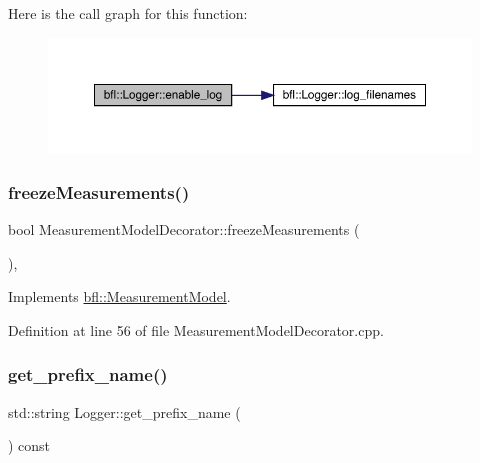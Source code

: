 Here is the call graph for this function\+:
\nopagebreak
\begin{figure}[H]
\begin{center}
\leavevmode
\includegraphics[width=350pt]{classbfl_1_1Logger_ae94b97b6e8d7902e8ce048384813122e_cgraph}
\end{center}
\end{figure}
\mbox{\label{classbfl_1_1MeasurementModelDecorator_a17d5fb12bfa048ca56160f745f112e32}} 
\subsubsection{\texorpdfstring{freeze\+Measurements()}{freezeMeasurements()}}
{\footnotesize\ttfamily bool Measurement\+Model\+Decorator\+::freeze\+Measurements (\begin{DoxyParamCaption}{ }\end{DoxyParamCaption})\hspace{0.3cm}{\ttfamily [override]}, {\ttfamily [virtual]}}



Implements \mbox{\hyperlink{classbfl_1_1MeasurementModel_a67ef096c5b3682252582aec75498089d}{bfl\+::\+Measurement\+Model}}.



Definition at line 56 of file Measurement\+Model\+Decorator.\+cpp.

\mbox{\label{classbfl_1_1Logger_a913a795b7bfbf378815eeb342d68a7c0}} 
\subsubsection{\texorpdfstring{get\+\_\+prefix\+\_\+name()}{get\_prefix\_name()}}
{\footnotesize\ttfamily std\+::string Logger\+::get\+\_\+prefix\+\_\+name (\begin{DoxyParamCaption}{ }\end{DoxyParamCaption}) const\hspace{0.3cm}{\ttfamily [inherited]}}



